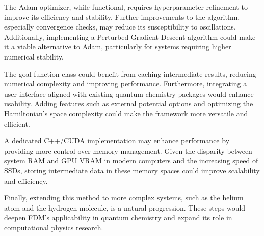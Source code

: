 %
%
%
%
%
%
%
%
%
The Adam optimizer, while functional, requires hyperparameter refinement to improve its efficiency and stability. Further improvements to the algorithm, especially convergence checks, may reduce its susceptibility to oscillations. Additionally, implementing a Perturbed Gradient Descent algorithm could make it a viable alternative to Adam, particularly for systems requiring higher numerical stability.

The goal function class could benefit from caching intermediate results, reducing numerical complexity and improving performance. Furthermore, integrating a user interface aligned with existing quantum chemistry packages would enhance usability. Adding features such as external potential options and optimizing the Hamiltonian's space complexity could make the framework more versatile and efficient.

A dedicated C++/CUDA implementation may enhance performance by providing more control over memory management. Given the disparity between system RAM and GPU VRAM in modern computers and the increasing speed of SSDs, storing intermediate data in these memory spaces could improve scalability and efficiency.

Finally, extending this method to more complex systems, such as the helium atom and the hydrogen molecule, is a natural progression. These steps would deepen FDM's applicability in quantum chemistry and expand its role in computational physics research.